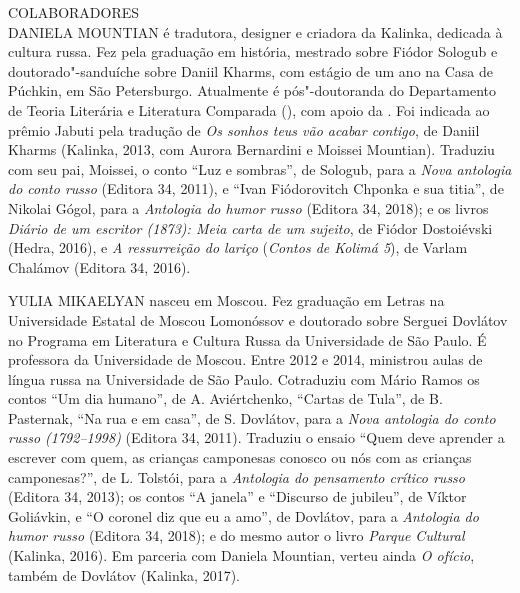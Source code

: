 \clearpage
\thispagestyle{empty}

\movetoevenpage
\small\MyriadPro
\label{colaboradores}

\noindent{}COLABORADORES\\

\noindent{}DANIELA MOUNTIAN é tradutora, designer e criadora da Kalinka, de­dicada
à cultura russa. Fez pela  graduação em história, mestrado sobre
Fiódor Sologub e doutorado"-sanduíche sobre Daniil Kharms, com estágio de
um ano na Casa de Púchkin, em São Petersburgo. Atualmente é
pós"-doutoranda do Departamento de Teoria Literária e Literatura
Comparada (), com apoio da . Foi indicada ao prêmio Jabuti pela
tradução de \emph{Os sonhos teus vão acabar contigo}, de Daniil Kharms
(Kalinka, 2013, com Aurora Bernardini e Mois­sei Mountian). Traduziu com
seu pai, Moissei, o conto ``Luz e sombras'', de Sologub, para a
\emph{Nova antologia do conto russo} (Editora 34, 2011), e ``Ivan
Fiódorovitch Chponka e sua titia'', de Nikolai Gógol, para a
\emph{Antologia do humor russo} (Editora 34, 2018); e os livros
\emph{Diário de um escritor (1873): Meia carta de um sujeito}, de Fiódor
Dostoiévski (Hedra, 2016), e \emph{A ressurreição do lariço}
(\emph{Contos de Kolimá 5}), de Varlam Chalámov (Editora 34, 2016).


\medskip

\noindent{}YULIA MIKAELYAN nasceu em Moscou. Fez graduação em Letras na
Universidade Estatal de Moscou Lomonóssov e doutorado sobre Serguei
Dovlátov no Programa em Literatura e Cultura Russa da Universidade de
São Paulo. É professora da Universidade  de Moscou. Entre 2012 e
2014, ministrou aulas de língua russa na Universidade de São Paulo.
Cotraduziu com Mário Ramos os contos ``Um dia humano'', de A.
Aviértchenko, ``Cartas de Tula'', de B. Pasternak, ``Na rua e em casa'',
de S. Dovlátov, para a \emph{Nova antologia do conto russo (1792--1998)}
(Editora 34, 2011). Traduziu o ensaio ``Quem deve aprender a escrever
com quem, as crianças camponesas conosco ou nós com as crianças
campone­sas?'', de L. Tolstói, para a \emph{Antologia do pensamento
crítico russo} (Editora 34, 2013); os contos ``A janela'' e ``Discurso de jubileu'', de Víktor Goliávkin, e ``O coronel diz que eu a amo'', de Dovlátov, para a \emph{Antologia do humor russo} (Editora 34,
2018); e do mesmo autor o livro \emph{Parque Cultural} (Kalinka, 2016).
Em parceria com Daniela Mountian, verteu ainda \emph{O ofício}, também
de Dovlátov (Kalinka, 2017).

